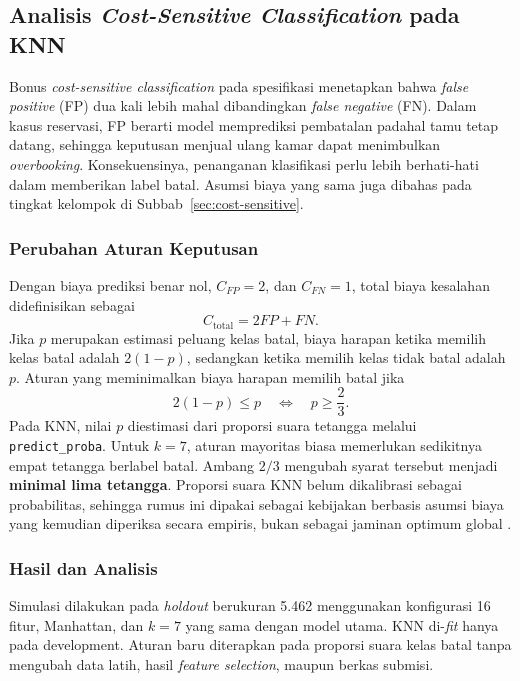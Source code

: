 \subsection{Analisis \textit{Cost-Sensitive Classification} pada KNN}
\label{subsec:knn-bonus}

Bonus \textit{cost-sensitive classification} pada spesifikasi menetapkan bahwa \textit{false positive} (FP) dua kali lebih mahal dibandingkan \textit{false negative} (FN). Dalam kasus reservasi, FP berarti model memprediksi pembatalan padahal tamu tetap datang, sehingga keputusan menjual ulang kamar dapat menimbulkan \textit{overbooking}. Konsekuensinya, penanganan klasifikasi perlu lebih berhati-hati dalam memberikan label batal. Asumsi biaya yang sama juga dibahas pada tingkat kelompok di Subbab~\ref{sec:cost-sensitive}.

\subsubsection{Perubahan Aturan Keputusan}
Dengan biaya prediksi benar nol, $C_{FP}=2$, dan $C_{FN}=1$, total biaya kesalahan didefinisikan sebagai
\begin{equation}
 C_{\mathrm{total}} = 2FP + FN.
 \label{eq:knn-cost}
\end{equation}
Jika $p$ merupakan estimasi peluang kelas batal, biaya harapan ketika memilih kelas batal adalah $2(1-p)$, sedangkan ketika memilih kelas tidak batal adalah $p$. Aturan yang meminimalkan biaya harapan memilih batal jika
\begin{equation}
 2(1-p)\le p \quad\Longleftrightarrow\quad p\ge\frac{2}{3}.
 \label{eq:knn-threshold}
\end{equation}
Pada KNN, nilai $p$ diestimasi dari proporsi suara tetangga melalui \texttt{predict\_proba}. Untuk $k=7$, aturan mayoritas biasa memerlukan sedikitnya empat tetangga berlabel batal. Ambang $2/3$ mengubah syarat tersebut menjadi \textbf{minimal lima tetangga}. Proporsi suara KNN belum dikalibrasi sebagai probabilitas, sehingga rumus ini dipakai sebagai kebijakan berbasis asumsi biaya yang kemudian diperiksa secara empiris, bukan sebagai jaminan optimum global \cite{elkan2001cost}.

\subsubsection{Hasil dan Analisis}
Simulasi dilakukan pada \textit{holdout} berukuran 5.462 menggunakan konfigurasi 16 fitur, Manhattan, dan $k=7$ yang sama dengan model utama. KNN di-\textit{fit} hanya pada development. Aturan baru diterapkan pada proporsi suara kelas batal tanpa mengubah data latih, hasil \textit{feature selection}, maupun berkas submisi.

